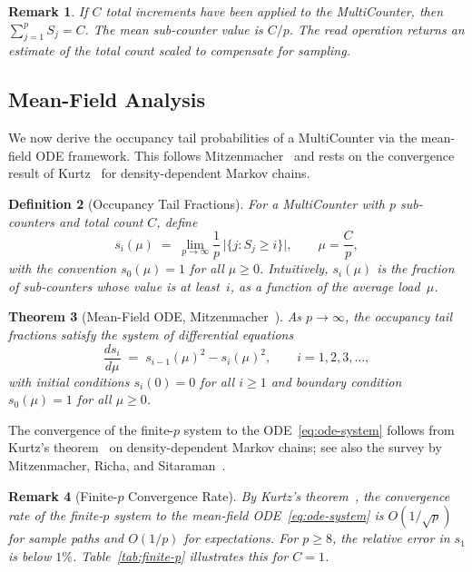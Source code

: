 \documentclass[11pt,a4paper]{article}
\newtheorem{theorem}{Theorem}[section]
\newtheorem{definition}[theorem]{Definition}
\newtheorem{remark}[theorem]{Remark}
\begin{document}
\begin{remark}\label{rem:total-count}
If $C$ total increments have been applied to the MultiCounter, then
$\sum_{j=1}^{p} S_j = C$.  The mean sub-counter value is $C/p$.
The read operation returns an \emph{estimate} of the total count scaled to
compensate for sampling.
\end{remark}

\subsection{Mean-Field Analysis}\label{ssec:mean-field}

We now derive the occupancy tail probabilities of a MultiCounter via
the mean-field ODE framework.  This follows Mitzenmacher~\cite{mitzenmacher1996}
and rests on the convergence result of Kurtz~\cite{kurtz1970} for
density-dependent Markov chains.

\begin{definition}[Occupancy Tail Fractions]\label{def:tail}
For a MultiCounter with $p$ sub-counters and total count $C$, define
\begin{equation}\label{eq:si-def}
  s_i(\mu) \;=\; \lim_{p \to \infty}
  \frac{1}{p}\,\bigl|\{j : S_j \ge i\}\bigr|,
  \qquad \mu = \frac{C}{p},
\end{equation}
with the convention $s_0(\mu) = 1$ for all $\mu \ge 0$.
Intuitively, $s_i(\mu)$ is the fraction of sub-counters whose value is at
least~$i$, as a function of the average load~$\mu$.
\end{definition}

\begin{theorem}[Mean-Field ODE, Mitzenmacher~\cite{mitzenmacher1996}]
\label{thm:mean-field-ode}
As $p \to \infty$, the occupancy tail fractions satisfy the system of
differential equations
\begin{equation}\label{eq:ode-system}
  \frac{ds_i}{d\mu}
  \;=\; s_{i-1}(\mu)^2 - s_i(\mu)^2,
  \qquad i = 1, 2, 3, \ldots,
\end{equation}
with initial conditions $s_i(0) = 0$ for all $i \ge 1$ and
boundary condition $s_0(\mu) = 1$ for all $\mu \ge 0$.
\end{theorem}

The convergence of the finite-$p$ system to the ODE~\eqref{eq:ode-system}
follows from Kurtz's theorem~\cite{kurtz1970} on density-dependent Markov
chains; see also the survey by Mitzenmacher, Richa, and
Sitaraman~\cite{mitzenmacher2001survey}.

\begin{remark}[Finite-$p$ Convergence Rate]\label{rem:finite-p-rate}
By Kurtz's theorem~\cite{kurtz1970}, the convergence rate of the finite-$p$
system to the mean-field ODE~\eqref{eq:ode-system} is $O(1/\sqrt{p})$ for
sample paths and $O(1/p)$ for expectations.  For $p \ge 8$, the relative
error in $s_1$ is below $1\%$.  Table~\ref{tab:finite-p} illustrates this
for $C = 1$.
\end{remark}
\end{document}

